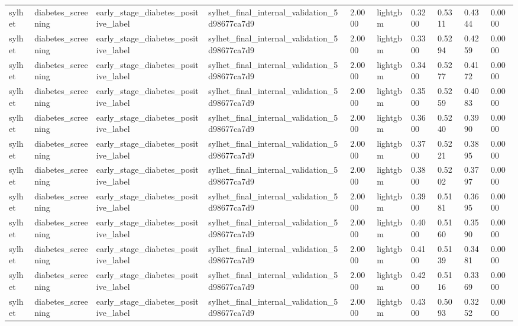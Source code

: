 \begin{tabular}{llllllllll}
sylhet & diabetes\_screening & early\_stage\_diabetes\_positive\_label & sylhet\_final\_internal\_validation\_5d98677ca7d9 & 2.0000 & lightgbm & 0.3200 & 0.5311 & 0.4344 & 0.0000 \\
sylhet & diabetes\_screening & early\_stage\_diabetes\_positive\_label & sylhet\_final\_internal\_validation\_5d98677ca7d9 & 2.0000 & lightgbm & 0.3300 & 0.5294 & 0.4259 & 0.0000 \\
sylhet & diabetes\_screening & early\_stage\_diabetes\_positive\_label & sylhet\_final\_internal\_validation\_5d98677ca7d9 & 2.0000 & lightgbm & 0.3400 & 0.5277 & 0.4172 & 0.0000 \\
sylhet & diabetes\_screening & early\_stage\_diabetes\_positive\_label & sylhet\_final\_internal\_validation\_5d98677ca7d9 & 2.0000 & lightgbm & 0.3500 & 0.5259 & 0.4083 & 0.0000 \\
sylhet & diabetes\_screening & early\_stage\_diabetes\_positive\_label & sylhet\_final\_internal\_validation\_5d98677ca7d9 & 2.0000 & lightgbm & 0.3600 & 0.5240 & 0.3990 & 0.0000 \\
sylhet & diabetes\_screening & early\_stage\_diabetes\_positive\_label & sylhet\_final\_internal\_validation\_5d98677ca7d9 & 2.0000 & lightgbm & 0.3700 & 0.5221 & 0.3895 & 0.0000 \\
sylhet & diabetes\_screening & early\_stage\_diabetes\_positive\_label & sylhet\_final\_internal\_validation\_5d98677ca7d9 & 2.0000 & lightgbm & 0.3800 & 0.5202 & 0.3797 & 0.0000 \\
sylhet & diabetes\_screening & early\_stage\_diabetes\_positive\_label & sylhet\_final\_internal\_validation\_5d98677ca7d9 & 2.0000 & lightgbm & 0.3900 & 0.5181 & 0.3695 & 0.0000 \\
sylhet & diabetes\_screening & early\_stage\_diabetes\_positive\_label & sylhet\_final\_internal\_validation\_5d98677ca7d9 & 2.0000 & lightgbm & 0.4000 & 0.5160 & 0.3590 & 0.0000 \\
sylhet & diabetes\_screening & early\_stage\_diabetes\_positive\_label & sylhet\_final\_internal\_validation\_5d98677ca7d9 & 2.0000 & lightgbm & 0.4100 & 0.5139 & 0.3481 & 0.0000 \\
sylhet & diabetes\_screening & early\_stage\_diabetes\_positive\_label & sylhet\_final\_internal\_validation\_5d98677ca7d9 & 2.0000 & lightgbm & 0.4200 & 0.5116 & 0.3369 & 0.0000 \\
sylhet & diabetes\_screening & early\_stage\_diabetes\_positive\_label & sylhet\_final\_internal\_validation\_5d98677ca7d9 & 2.0000 & lightgbm & 0.4300 & 0.5093 & 0.3252 & 0.0000 \\

\end{tabular}
